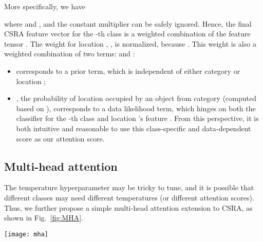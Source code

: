 \documentclass[10pt,twocolumn,letterpaper]{article}
\begin{document}
More specifically, we have

where  and , and the constant multiplier  can be safely ignored. Hence, the final CSRA feature vector for the -th class is a weighted combination of the feature tensor . The weight for location , , is normalized, because . This weight is also a weighted combination of two terms:  and :
\begin{itemize}
	\item  corresponds to a prior term, which is independent of either category  or location ;
	\item , the probability of location  occupied by an object from category  (computed based on ), corresponds to a data likelihood term, which hinges on both the classifier  for the -th class and location 's feature . From this perspective, it is both intuitive and reasonable to use this class-specific and data-dependent score as our attention score.
\end{itemize}

\subsection{Multi-head attention}\label{sec:MHA}

The temperature hyperparameter  may be tricky to tune, and it is possible that different classes may need different temperatures (or different attention scores). Thus, we further propose a simple multi-head attention extension to CSRA, as shown in Fig.~\ref{fig:MHA}.

\begin{figure*}
	\centering
	\texttt{[image: mha]}
	\caption{Overall pipeline of multi-head CSRA. An Image is first sent to a CNN backbone to get the feature tensor , which is used to generate multiple score tensors (,  is the number of classes) by different  convolutions (FCs). The residual attention defined in Eq.~(\ref{eq:yi_softmax}) is applied to every score tensor to produce different logits  (, ), which are then fused to get the final logits . The temperature  is different in different branches, but the same  is shared among them.}
	\label{fig:MHA}
\end{figure*}
\end{document}
